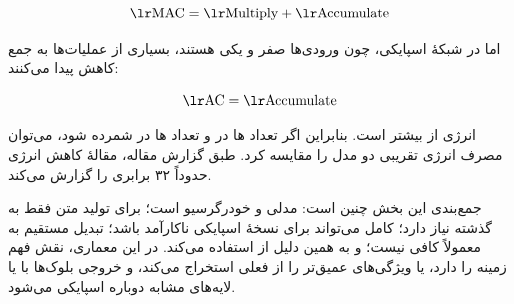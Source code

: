 \[
\text{\eng{MAC}} = \text{\eng{Multiply}} + \text{\eng{Accumulate}}
\]

اما در شبکهٔ اسپایکی، چون ورودی‌ها صفر و یکی هستند، بسیاری از عملیات‌ها به جمع کاهش پیدا می‌کنند:

\[
\text{\eng{AC}} = \text{\eng{Accumulate}}
\]


انرژی  از  بیشتر است. بنابراین اگر تعداد ها در  و تعداد ها در  شمرده شود، می‌توان مصرف انرژی تقریبی دو مدل را مقایسه کرد. طبق گزارش مقاله، مقالهٔ  کاهش انرژی حدوداً ۳۲ برابری را گزارش می‌کند.

جمع‌بندی این بخش چنین است:  مدلی  و خودرگرسیو است؛ برای تولید متن فقط به گذشته نیاز دارد؛  کامل می‌تواند برای نسخهٔ اسپایکی ناکارآمد باشد؛ تبدیل مستقیم  به  معمولاً کافی نیست؛ و  به همین دلیل از  استفاده می‌کند. در این معماری،  نقش فهم زمینه را دارد،  یا  ویژگی‌های عمیق‌تر را از  فعلی استخراج می‌کند، و خروجی بلوک‌ها با  یا لایه‌های مشابه دوباره اسپایکی می‌شود.
